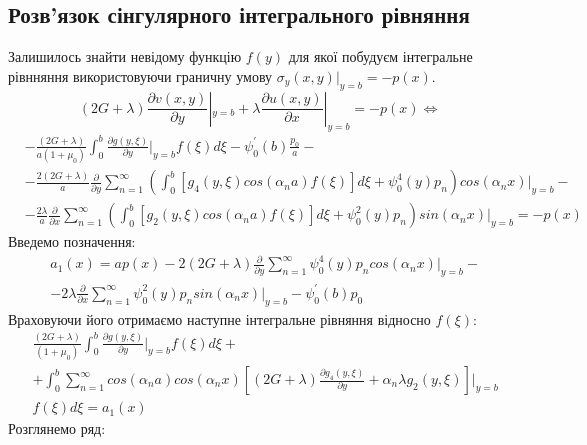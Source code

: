 \subsection{Розв'язок сінгулярного інтегрального рівняння}
Залишилось знайти невідому функцію $f(y)$ для якої побудуєм інтегральне рівнняння використовуючи граничну умову $\sigma_y(x, y) |_{y=b} = -p(x)$.
\begin{equation*}
    (2G + \lambda)\frac{\partial v(x,y)}{\partial y}|_{y=b} + \lambda\frac{\partial u(x,y)}{\partial x}|_{y=b} = -p(x) \Leftrightarrow
\end{equation*}
\begin{align*}
    &-\frac{(2G + \lambda)}{a(1+\mu_0)} \int_{0}^{b}\frac{\partial g(y, \xi)}{\partial y}|_{y=b} f(\xi) d\xi - \psi_0^{'}(b) \frac{p_0}{a} - \\
    &- \frac{2(2G + \lambda)}{a} \frac{\partial}{\partial y} \sum_{n=1}^{\infty} \left( \int_0^b \left[g_4(y, \xi) cos(\alpha_n a) f(\xi) \right]d\xi + \psi_0^{4}(y) p_n \right) cos(\alpha_n x)|_{y=b} - \\
    & -\frac{2\lambda}{a} \frac{\partial}{\partial x} \sum_{n=1}^{\infty} \left( \int_0^b \left[g_2(y, \xi)cos(\alpha_n a) f(\xi) \right]d\xi + \psi_0^2(y) p_n \right) sin(\alpha_n x)|_{y=b} = -p(x)
\end{align*}
Введемо позначення:
\begin{align}
    &a_1(x) = a p(x) - 2(2G + \lambda) \frac{\partial}{\partial y} \sum_{n=1}^{\infty} \psi_0^{4}(y) p_n cos(\alpha_n x)|_{y=b} - \nonumber \\
    &- 2\lambda \frac{\partial}{\partial x} \sum_{n=1}^{\infty}\psi_0^2(y) p_n sin(\alpha_n x)|_{y=b} - \psi_0^{'}(b) p_0
\end{align}
Враховуючи його отримаємо наступне інтегральне рівняння відносно $f(\xi)$:
\begin{align}\label{int_dynamic_2}
    &\frac{(2G + \lambda)}{(1+\mu_0)} \int_{0}^{b}\frac{\partial g(y, \xi)}{\partial y}|_{y=b} f(\xi) d\xi + \nonumber \\ 
    &+ \int_{0}^{b} \sum_{n=1}^{\infty} cos(\alpha_n a) cos(\alpha_n x) \left[(2G + \lambda) \frac{\partial g_4(y, \xi)}{\partial y} + \alpha_n \lambda g_2(y, \xi) \right]|_{y=b} \nonumber \\
    &f(\xi) d\xi = a_1(x)
\end{align}
Розглянемо ряд:
